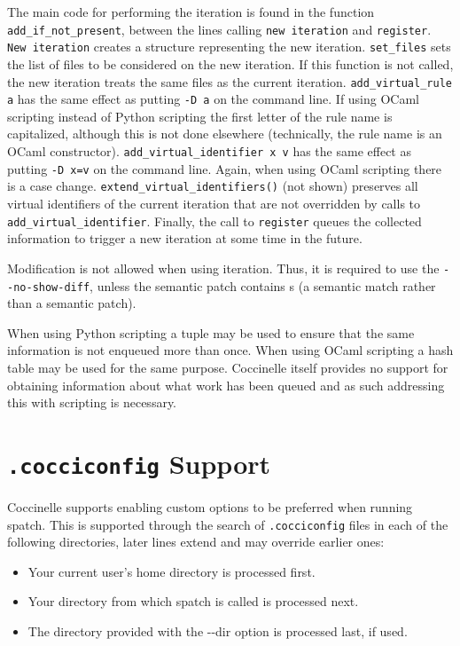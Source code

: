 The main code for performing the iteration is found in the function {\tt
  add\_if\_not\_present}, between the lines calling {\tt new iteration} and
{\tt register}.  {\tt New iteration} creates a structure representing the
new iteration.  {\tt set\_files} sets the list of files to be considered on
the new iteration.  If this function is not called, the new iteration
treats the same files as the current iteration.  {\tt add\_virtual\_rule a}
has the same effect as putting {\tt -D a} on the command line.  If
using OCaml scripting instead of Python scripting the first letter of the rule
name is capitalized, although this is not done elsewhere (technically, the
rule name is an OCaml constructor).
{\tt add\_virtual\_identifier x v} has the same effect as putting {\tt -D x=v}
on the command line.  Again, when using OCaml scripting there is a case change.
{\tt extend\_virtual\_identifiers()} (not shown) preserves all virtual
identifiers of the current iteration that are not overridden by calls to
{\tt add\_virtual\_identifier}.  Finally, the call to {\tt register} queues
the collected information to trigger a new iteration at some time in the
future.

Modification is not allowed when using iteration.  Thus, it is required to
use the {\tt -{}-no-show-diff}, unless the semantic patch contains {\tt *}s
(a semantic match rather than a semantic patch).

When using Python scripting a tuple may be used
to ensure that the same information is not enqueued more than once.
When using OCaml scripting a hash table may be used for the same purpose.
Coccinelle itself provides no support for obtaining information about what
work has been queued and as such addressing
this with scripting is necessary.

\section{{\tt .cocciconfig} Support}

Coccinelle supports enabling custom options to be preferred when running
spatch.  This is supported through the search of {\tt .cocciconfig} files in each of
the following directories, later lines extend and may override earlier ones:

\begin{itemize}
	\item Your current user's home directory is processed first.
	\item Your directory from which spatch is called is processed next.
	\item The directory provided with the -{}-dir option is processed last, if used.
\end{itemize}

